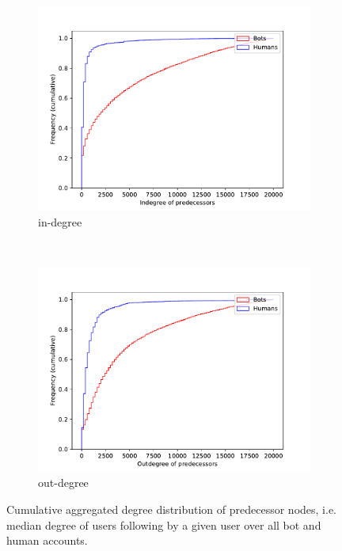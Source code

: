 \begin{figure}[t!]
    \centering
    \begin{subfigure}[t]{0.5\textwidth}
        \centering
        \includegraphics[width=\textwidth]{FIG/indegree_pre.pdf}
        \caption{in-degree}
    \end{subfigure}%
    ~ 
    \begin{subfigure}[t]{0.5\textwidth}
        \centering
        \includegraphics[width=\textwidth]{FIG/outdegree_pre.pdf}
        \caption{out-degree}
    \end{subfigure}
    \caption{Cumulative aggregated degree distribution of predecessor nodes, i.e. median degree of users following by a given user over all bot and human accounts.}
    \label{fig:cum_degrees_predecessors}
\end{figure}

